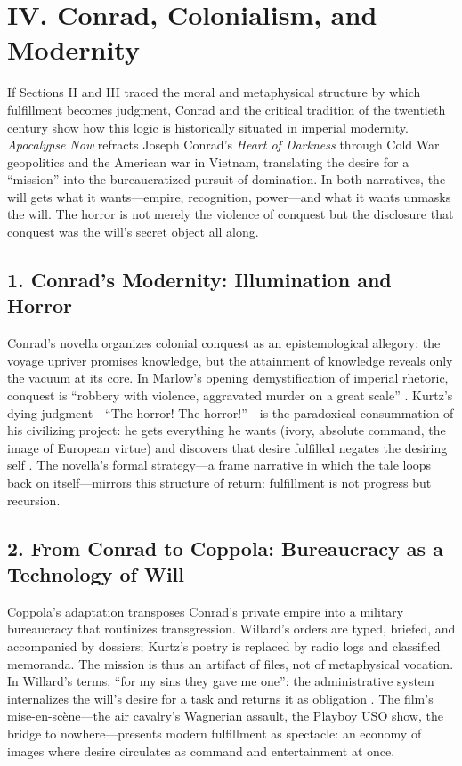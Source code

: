 \section*{IV. Conrad, Colonialism, and Modernity}

If Sections II and III traced the moral and metaphysical structure by which fulfillment becomes judgment, Conrad and the critical tradition of the twentieth century show how this logic is historically situated in imperial modernity. \textit{Apocalypse Now} refracts Joseph Conrad’s \textit{Heart of Darkness} through Cold War geopolitics and the American war in Vietnam, translating the desire for a ``mission'' into the bureaucratized pursuit of domination. In both narratives, the will gets what it wants---empire, recognition, power---and what it wants unmasks the will. The horror is not merely the violence of conquest but the disclosure that conquest was the will’s secret object all along.

\subsection*{1. Conrad’s Modernity: Illumination and Horror}
Conrad’s novella organizes colonial conquest as an epistemological allegory: the voyage upriver promises knowledge, but the attainment of knowledge reveals only the vacuum at its core. In Marlow’s opening demystification of imperial rhetoric, conquest is ``robbery with violence, aggravated murder on a great scale'' \parencite[ConradHOD1990]{ConradHOD1990}. Kurtz’s dying judgment---``The horror! The horror!''---is the paradoxical consummation of his civilizing project: he gets everything he wants (ivory, absolute command, the image of European virtue) and discovers that desire fulfilled negates the desiring self \parencite{ConradHOD1990}. The novella’s formal strategy---a frame narrative in which the tale loops back on itself---mirrors this structure of return: fulfillment is not progress but recursion.

\subsection*{2. From Conrad to Coppola: Bureaucracy as a Technology of Will}
Coppola’s adaptation transposes Conrad’s private empire into a military bureaucracy that routinizes transgression. Willard’s orders are typed, briefed, and accompanied by dossiers; Kurtz’s poetry is replaced by radio logs and classified memoranda. The mission is thus an artifact of files, not of metaphysical vocation. In Willard’s terms, ``for my sins they gave me one'': the administrative system internalizes the will’s desire for a task and returns it as obligation \parencite{CoppolaApocalypse1979}. The film’s mise-en-scène—the air cavalry’s Wagnerian assault, the Playboy USO show, the bridge to nowhere—presents modern fulfillment as spectacle: an economy of images where desire circulates as command and entertainment at once.

